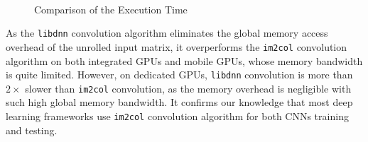 \documentclass{article}
\begin{document}
\begin{figure}[h!]
 \\



\caption{Comparison of the Execution Time \label{result}}

\end{figure}


As the \texttt{libdnn} convolution algorithm eliminates the global memory access overhead of the unrolled input matrix, it overperforms the \texttt{im2col} convolution algorithm on both integrated GPUs and mobile GPUs, whose memory bandwidth is quite limited. However, on dedicated GPUs, \texttt{libdnn} convolution is more than $2 \times$ slower than \texttt{im2col} convolution, as the memory overhead is negligible with such high global memory bandwidth. It confirms our knowledge that most deep learning frameworks use \texttt{im2col} convolution algorithm for both CNNs training and testing.
\end{document}
